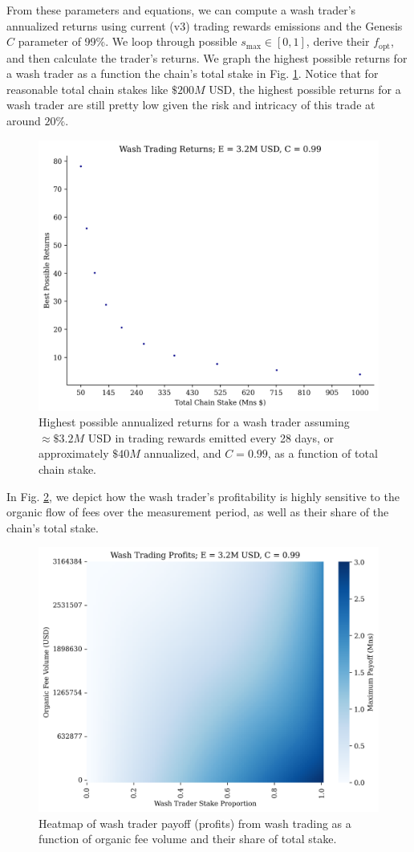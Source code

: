         From these parameters and equations, we can compute a wash trader's annualized returns using current (v3) trading rewards emissions and the Genesis $C$ parameter of 99\%. We loop through possible $s_{\text{max}} \in [0, 1]$, derive their $f_{\text{opt}}$, and then calculate the trader's returns. We graph the highest possible returns for a wash trader as a function the chain's total stake in Fig. \ref{fig:best_returns}. Notice that for reasonable total chain stakes like $\$200M$ USD, the highest possible returns for a wash trader are still pretty low given the risk and intricacy of this trade at around $20\%$.

        \begin{figure}[htp]
            \centering
            \includegraphics[width=0.7\linewidth]{figs/best_returns_3.16_0.99_0.05.png}
            \caption{Highest possible annualized returns for a wash trader assuming $\approx \$3.2M$ USD in trading rewards emitted every 28 days, or approximately $\$40M$ annualized, and $C=0.99$, as a function of total chain stake.}
            \label{fig:best_returns}
        \end{figure}

        In Fig. \ref{fig:payoff_heatmap}, we depict how the wash trader's profitability is highly sensitive to the organic flow of fees over the measurement period, as well as their share of the chain's total stake.

        \begin{figure}[htp]
            \centering
            \includegraphics[width=0.7\linewidth]{figs/payoff_heatmap_3.16_0.99_0.05.png}
            \caption{Heatmap of wash trader payoff (profits) from wash trading as a function of organic fee volume and their share of total stake.}
            \label{fig:payoff_heatmap}
        \end{figure}

